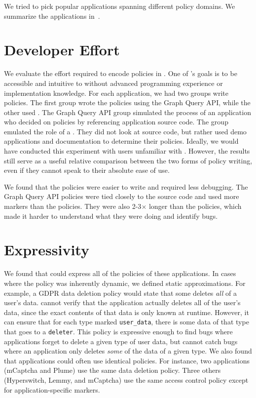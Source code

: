 We tried to pick popular applications spanning different policy domains.
%
We summarize the applications in~.

\section{Developer Effort}
\label{sec:accessibility}
%
We evaluate the effort required to encode policies in \syslang{}.
%
One of \syslang's goals is to be accessible and intuitive to \ces{} without advanced programming experience or implementation knowledge.
%
For each application, we had two groups write policies.
%
The first group wrote the policies using the Graph Query API, while the other used \syslang{}.
%
The Graph Query API group simulated the process of an application \dev{} who decided on policies by referencing application source code.
%
The \syslang{} group emulated the role of a \ce{}.
%
They did not look at source code, but rather used demo applications and documentation to determine their policies.
%
Ideally, we would have conducted this experiment with users unfamiliar with \sys{}.
%
However, the results still serve as a useful relative comparison between the two forms of policy writing,
even if they cannot speak to their absolute ease of use.

We found that the \syslang{} policies were easier to write and required less debugging.
%
The Graph Query API policies were tied closely to the source code and used more markers than the \syslang{} policies.
%
They were also 2-3$\times$ longer than the \syslang{} policies, 
which made it harder to understand what they were doing and identify bugs.


\section{Expressivity}
\label{sec:expressivity}
%
We found that \sys{} could express all of the policies of these applications.
%
In cases where the policy was inherently dynamic, we defined static approximations.
%
For example, a GDPR data deletion policy would state that some \controller{} deletes \emph{all} of a user's data.
%
\sys{} cannot verify that the application actually deletes all of the user's data,
since the exact contents of that data is only known at runtime.
%
However, it can ensure that for each type marked \lstinline[language=CNL]|user_data|, 
there is some data of that type that goes to a \lstinline[language=CNL]|deleter|.
%
This policy is expressive enough to find bugs where applications forget to delete a given type of user data,
but cannot catch bugs where an application only deletes \emph{some} of the data of a given type.
%
We also found that applications could often use identical policies.
%
For instance, two applications (mCaptcha and Plume) use the same data deletion policy.
%
Three others (Hyperswitch, Lemmy, and mCaptcha) use the same access control policy
except for application-specific markers.
%

